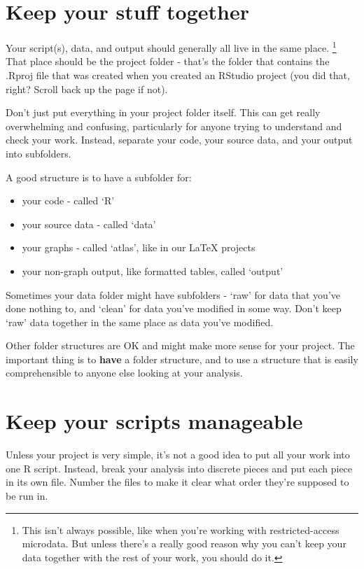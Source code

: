\documentclass[]{book}
\providecommand{\tightlist}{%
  \setlength{\itemsep}{0pt}\setlength{\parskip}{0pt}}
\begin{document}
\hypertarget{keep-your-stuff-together}{%
\section{Keep your stuff together}\label{keep-your-stuff-together}}

Your script(s), data, and output should generally all live in the same place. \footnote{This isn't always possible, like when you're working with restricted-access microdata. But unless there's a really good reason why you can't keep your data together with the rest of your work, you should do it.} That place should be the project folder - that's the folder that contains the .Rproj file that was created when you created an RStudio project (you did that, right? Scroll back up the page if not).

Don't just put everything in your project folder itself. This can get really overwhelming and confusing, particularly for anyone trying to understand and check your work. Instead, separate your code, your source data, and your output into subfolders.

A good structure is to have a subfolder for:

\begin{itemize}
\tightlist
\item
  your code - called `R'
\item
  your source data - called `data'
\item
  your graphs - called `atlas', like in our LaTeX projects
\item
  your non-graph output, like formatted tables, called `output'
\end{itemize}

Sometimes your data folder might have subfolders - `raw' for data that you've done nothing to, and `clean' for data you've modified in some way. Don't keep `raw' data together in the same place as data you've modified.

Other folder structures are OK and might make more sense for your project. The important thing is to \textbf{have} a folder structure, and to use a structure that is easily comprehensible to anyone else looking at your analysis.

\hypertarget{manageable}{%
\section{Keep your scripts manageable}\label{manageable}}

Unless your project is very simple, it's not a good idea to put all your work into one R script. Instead, break your analysis into discrete pieces and put each piece in its own file. Number the files to make it clear what order they're supposed to be run in.
\end{document}
